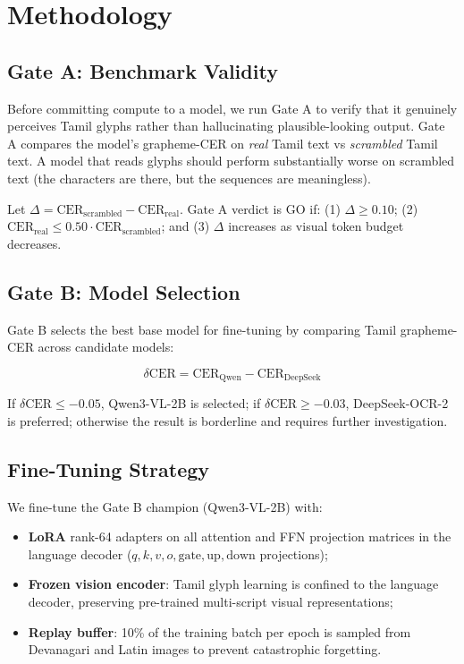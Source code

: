 \documentclass[11pt,a4paper]{article}
\begin{document}
\section{Methodology}
\label{sec:method}

\subsection{Gate A: Benchmark Validity}

Before committing compute to a model, we run Gate A to verify that it
genuinely perceives Tamil glyphs rather than hallucinating plausible-looking
output.
Gate A compares the model's grapheme-CER on \emph{real} Tamil text vs
\emph{scrambled} Tamil text.
A model that reads glyphs should perform substantially worse on scrambled
text (the characters are there, but the sequences are meaningless).

\begin{definition}
Let $\Delta = \text{CER}_\text{scrambled} - \text{CER}_\text{real}$.
Gate A verdict is GO if:
(1) $\Delta \geq 0.10$;
(2) $\text{CER}_\text{real} \leq 0.50 \cdot \text{CER}_\text{scrambled}$; and
(3) $\Delta$ increases as visual token budget decreases.
\end{definition}

\subsection{Gate B: Model Selection}

Gate B selects the best base model for fine-tuning by comparing
Tamil grapheme-CER across candidate models:

\begin{equation}
\delta\text{CER} = \text{CER}_\text{Qwen} - \text{CER}_\text{DeepSeek}
\end{equation}

If $\delta\text{CER} \leq -0.05$, Qwen3-VL-2B is selected; if
$\delta\text{CER} \geq -0.03$, DeepSeek-OCR-2 is preferred; otherwise
the result is borderline and requires further investigation.

\subsection{Fine-Tuning Strategy}

We fine-tune the Gate B champion (Qwen3-VL-2B) with:
\begin{itemize}
  \item \textbf{LoRA} rank-64 adapters on all attention and FFN projection
        matrices in the language decoder
        ($q, k, v, o, \text{gate}, \text{up}, \text{down}$ projections);
  \item \textbf{Frozen vision encoder}: Tamil glyph learning is confined to
        the language decoder, preserving pre-trained multi-script visual
        representations;
  \item \textbf{Replay buffer}: 10\% of the training batch per epoch is
        sampled from Devanagari and Latin images to prevent catastrophic
        forgetting.
\end{itemize}
\end{document}

